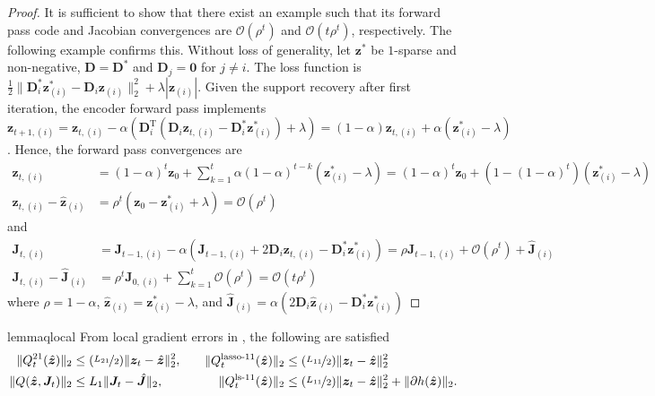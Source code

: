 \documentclass[10pt]{article} %
\newcommand{\D}{{\bm D}}
\newcommand{\J}{{\bm J}}
\newcommand{\z}{{\bm z}}
\newcommand{\zero}{{\bm 0}}
\begin{document}
%
\begin{proof}
It is sufficient to show that there exist an example such that its forward pass code and Jacobian convergences are $\mathcal{O}(\rho^t)$ and $\mathcal{O}(t \rho^t)$, respectively. The following example confirms this. Without loss of generality, let $\z^{\ast}$ be $1$-sparse and  non-negative, $\D = \D^{\ast}$ and $\D_{j} = \zero$ for $j \neq i$. The loss function is $\frac{1}{2} \| \D_i^{\ast} \z^{\ast}_{(i)} - \D_i \z_{(i)} \|_2^2 + \lambda | \z_{(i)} |$. Given the support recovery after first iteration, the encoder forward pass implements $\z_{t+1, (i)} = \z_{t, (i)} - \alpha (\D^{\text{T}}_i(\D_i \z_{t, (i)} - \D^{\ast}_i \z^{\ast}_{(i)}) + \lambda) = (1- \alpha) \z_{t, (i)} + \alpha (\z^{\ast}_{(i)} - \lambda)$. Hence, the forward pass convergences are
\begin{equation}
\begin{aligned}
\z_{t, (i)} &= (1 - \alpha)^t \z_0 + \sum_{k=1}^t \alpha (1 - \alpha)^{t-k} (\z^{\ast}_{(i)} - \lambda) =  (1 - \alpha)^t \z_0 +( 1 - (1 - \alpha)^{t}) (\z^{\ast}_{(i)} - \lambda)\\
\z_{t, (i)}  - \hat \z_{(i)} &= \rho^{t} (\z_0 - \z^{\ast}_{(i)} + \lambda) = \mathcal{O}(\rho^t)
\end{aligned}
\end{equation}
and
\begin{equation}
\begin{aligned}
\J_{t, (i)} &= \J_{t-1, (i)} - \alpha (\J_{t-1, (i)} + 2 \D_i \z_{t, (i)}  - \D^{\ast}_i \z^{\ast}_{(i)}) = \rho \J_{t-1, (i)} + \mathcal{O}(\rho^t) + \hat \J_{(i)}\\
\J_{t, (i)}  - \hat \J_{(i)} &= \rho^{t} \J_{0, (i)} + \sum_{k=1}^t \mathcal{O}(\rho^t) = \mathcal{O}(t \rho^t)
\end{aligned}
\end{equation}
where $\rho = 1 - \alpha$, $\hat \z_{(i)} = \z^{\ast}_{(i)} - \lambda$, and $\hat \J_{(i)} = \alpha (2 \D_i \hat \z_{(i)} - \D_i^{\ast} \z^{\ast}_{(i)})$
\end{proof}
%
\begin{restatable}{lemma}{qlocal}\label{lemma:qlocal}
From local gradient errors in , the following are satisfied
\begin{equation}
\begin{aligned}
\| Q_t^{21}(\hat \z) \|_2 &\leq (\nicefrac{L_{21}}{2}) \| \z_t - \hat \z \|_2^2,\\
\| Q(\hat \z, \J_t) \|_2 &\leq L_1 \| \J_t - \hat \J \|_2,
\end{aligned}
\begin{aligned}
\quad \quad \| Q_t^{\text{lasso-}11}(\hat \z) \|_2 &\leq (\nicefrac{L_{11}}{2}) \| \z_t - \hat \z \|_2^2\\
\| Q_t^{\text{ls-}11}(\hat \z) \|_2 &\leq (\nicefrac{L_{11}}{2}) \| \z_t - \hat \z \|_2^2 + \| \partial h(\hat \z) \|_2.
\end{aligned}
\end{equation}
\end{restatable}
\end{document}
